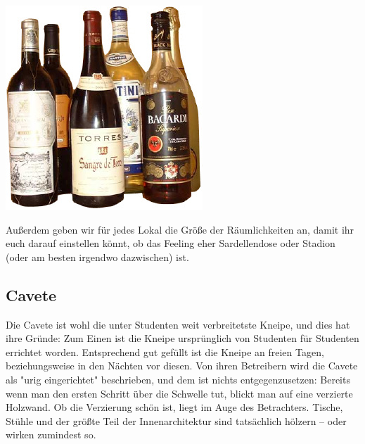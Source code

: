 {\begin{multicols*}{2}
\begin{center}
	\includegraphics[width=\columnwidth, height=0.22\textheight]{res/kneipenguide_flaschen.png}
\end{center}

Außerdem geben wir für jedes Lokal die Größe der Räumlichkeiten an, damit ihr euch darauf einstellen könnt, ob das Feeling eher Sardellendose oder Stadion (oder am besten irgendwo dazwischen) ist.

\subsection{Cavete}
Die Cavete ist wohl die unter Studenten weit verbreitetste Kneipe, und dies hat ihre Gründe: Zum Einen ist die Kneipe ursprünglich von Studenten für Studenten errichtet worden.
Entsprechend gut gefüllt ist die Kneipe an freien Tagen, beziehungsweise in den Nächten vor diesen.
Von ihren Betreibern wird die Cavete als "urig eingerichtet" beschrieben, und dem ist nichts entgegenzusetzen:
Bereits wenn man den ersten Schritt über die Schwelle tut, blickt man auf eine verzierte Holzwand.
Ob die Verzierung schön ist, liegt im Auge des Betrachters.
Tische, Stühle und der größte Teil der Innenarchitektur sind tatsächlich hölzern -- oder wirken zumindest so.


\end{multicols*}}
